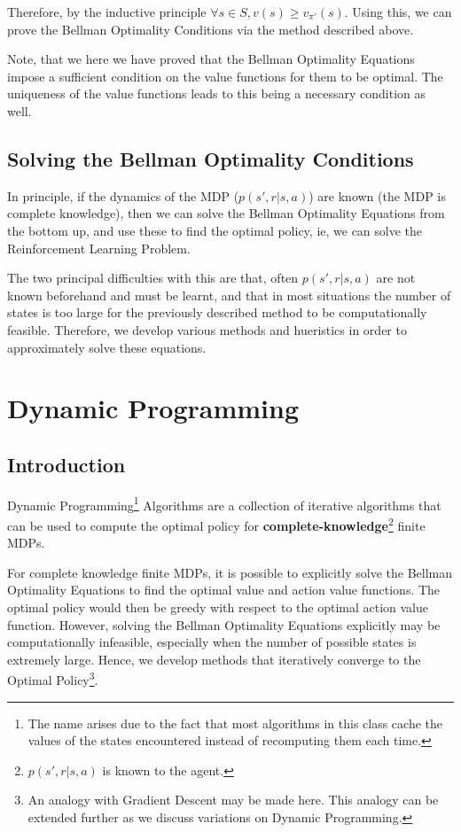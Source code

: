 \documentclass[12pt]{report}
\begin{document}
Therefore, by the inductive principle $\forall s \in S, v(s) \geq v_{\pi'}(s)$. Using this, we can prove the Bellman Optimality Conditions via the method described above.

Note, that we here we have proved that the Bellman Optimality Equations impose a sufficient condition on the value functions for them to be optimal. The uniqueness of the value functions leads to this being a necessary condition as well.

\section{Solving the Bellman Optimality Conditions}
In principle, if the dynamics of the MDP ($p(s', r | s, a)$) are known (the MDP is complete knowledge), then we can solve the Bellman Optimality Equations from the bottom up, and use these to find the optimal policy, ie, we can solve the Reinforcement Learning Problem.

The two principal difficulties with this are that, often $p(s', r | s, a)$ are not known beforehand and must be learnt, and that in most situations the number of states is too large for the previously described method to be computationally feasible. Therefore, we develop various methods and 
hueristics in order to approximately solve these equations.

\chapter{Dynamic Programming}
\section{Introduction}
Dynamic Programming\footnote{The name arises due to the fact that most algorithms in this class cache the values of the states encountered instead of recomputing them each time.} Algorithms are a collection of iterative algorithms that can be used to compute the optimal policy for \textbf{complete-knowledge}\footnote{$p(s', r | s, a)$ is known to the agent.} finite MDPs. 

For complete knowledge finite MDPs, it is possible to explicitly solve the Bellman Optimality Equations to find the optimal value and action value functions. The optimal policy would then be greedy with respect to 
the optimal action value function. However, solving the Bellman Optimality Equations explicitly may be computationally infeasible, especially when the number of possible states is extremely large. Hence, we develop 
methods that iteratively converge to the Optimal Policy\footnote{An analogy with Gradient Descent may be made here. This analogy can be extended further as we discuss variations on Dynamic Programming.}.
\end{document}
